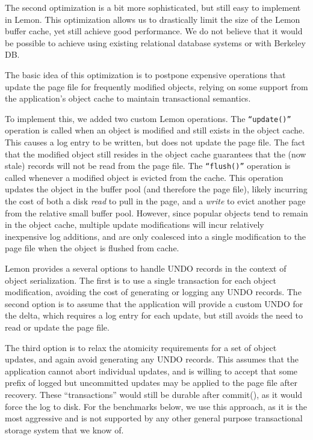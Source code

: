 \documentclass[10pt,letterpaper,twocolumn,english]{article}
\newcommand{\yad}{Lemon\xspace}
\begin{document}

The second optimization is a bit more sophisticated, but still easy to
implement in \yad.  This optimization allows us to drastically limit
the size of the
\yad buffer cache, yet still achieve good performance.
We do not believe that it would be possible to
achieve using existing relational database systems or with Berkeley DB.  

The basic idea of this optimization is to postpone expensive
operations that update the page file for frequently modified objects,
relying on some support from the application's object cache
to maintain transactional semantics.

To implement this, we added two custom \yad operations. The
{\tt``update()''} operation is called when an object is modified and
still exists in the object cache. This causes a log entry to be
written, but does not update the page file. The fact that the modified
object still resides in the object cache guarantees that the (now stale)
records will not be read from the page file. The {\tt ``flush()''}
operation is called whenever a modified object is evicted from the
cache. This operation updates the object in the buffer pool (and
therefore the page file), likely incurring the cost of both a disk {\em
read} to pull in the page, and a {\em write} to evict another page
from the relative small buffer pool.  However, since popular 
objects tend to remain in the object cache, multiple update
modifications will incur relatively inexpensive log additions,
and are only coalesced into a single modification to the page file
when the object is flushed from cache.

\yad provides a several options  to handle UNDO records in the context
of object serialization. The first is to use a single transaction for
each object modification, avoiding the cost of generating or logging
any UNDO records. The second option is to assume that the
application will provide a custom UNDO for the delta, 
which requires a log entry for each update, 
but still avoids the need to read or update the page
file.

The third option is to relax the atomicity requirements for a set of
object updates, and again avoid generating any UNDO records. This
assumes that the application cannot abort individual updates, 
and is willing to
accept that some prefix of logged but uncommitted updates may 
be applied to the page
file after recovery. These ``transactions'' would still be durable
after commit(), as it would force the log to disk. 
For the benchmarks below, we
use this approach, as it is the most aggressive and is
not supported by any other general purpose transactional 
storage system that we know of.
\end{document}
